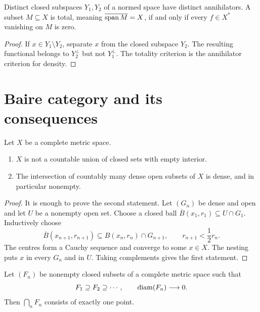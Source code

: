 \begin{noteexercise}
Distinct closed subspaces $Y_1,Y_2$ of a normed space have distinct
annihilators.  A subset $M\subseteq X$ is total, meaning
$\overline{\operatorname{span} M}=X$, if and only if every $f\in X^*$ vanishing on $M$ is
zero.
\end{noteexercise}

\begin{proof}
If $x\in Y_1\setminus Y_2$, separate $x$ from the closed subspace $Y_2$.
The resulting functional belongs to $Y_2^\perp$ but not $Y_1^\perp$.  The
totality criterion is the annihilator criterion for density.
\end{proof}

\section{Baire category and its consequences}

\begin{notetheorem}
Let $X$ be a complete metric space.
\begin{enumerate}
  \item $X$ is not a countable union of closed sets with empty interior.
  \item The intersection of countably many dense open subsets of $X$ is
        dense, and in particular nonempty.
\end{enumerate}
\end{notetheorem}

\begin{proof}
It is enough to prove the second statement.  Let $(G_n)$ be dense and open and
let $U$ be a nonempty open set.  Choose a closed ball
$\overline B(x_1,r_1)\subseteq U\cap G_1$.  Inductively choose
\[
  \overline B(x_{n+1},r_{n+1})
  \subseteq B(x_n,r_n)\cap G_{n+1},
  \qquad r_{n+1}<\frac12r_n.
\]
The centres form a Cauchy sequence and converge to some $x\in X$.  The nesting
puts $x$ in every $G_n$ and in $U$.  Taking complements gives the first
statement.
\end{proof}

\begin{notetheorem}
Let $(F_n)$ be nonempty closed subsets of a complete metric space such that
\[
  F_1\supseteq F_2\supseteq\cdots,
  \qquad
  \operatorname{diam}(F_n)\longrightarrow0.
\]
Then $\bigcap_nF_n$ consists of exactly one point.
\end{notetheorem}

